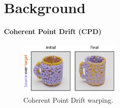 \documentclass{article}
\begin{document}



\section{Background}
\label{sec:background}

\paragraph{Coherent Point Drift (CPD)}

\begin{figure}
    \centering
    \vspace{-2.5em}
    \includegraphics[width=0.45\textwidth]{figures/warping_small.pdf}
    \caption{Coherent Point Drift warping.}
    \label{fig:warping}
\end{figure}
\end{document}
